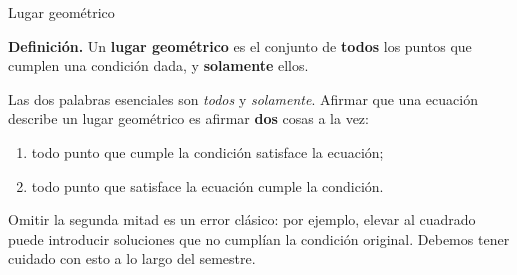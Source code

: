 \documentclass[aspectratio=169,10pt]{beamer}
\newcommand{\destaca}[1]{%
  \par\vspace{3pt}\noindent
  \colorbox{turquesaClaro}{%
    \parbox{\dimexpr\linewidth-2\fboxsep\relax}{\vspace{3pt}#1\vspace{3pt}}}%
  \par\vspace{3pt}}
\begin{document}
\begin{frame}{Lugar geométrico}
  \destaca{\textbf{Definición.} Un \textbf{lugar geométrico} es el
  conjunto de \textbf{todos} los puntos que cumplen una condición dada,
  y \textbf{solamente} ellos.}

  \vspace{0.4cm}
  Las dos palabras esenciales son \textit{todos} y \textit{solamente}.
  Afirmar que una ecuación describe un lugar geométrico es afirmar
  \textbf{dos} cosas a la vez:

  \vspace{0.2cm}
  \begin{enumerate}
    \item todo punto que cumple la condición satisface la ecuación;
    \item todo punto que satisface la ecuación cumple la condición.
  \end{enumerate}

  \vspace{0.3cm}
  {\footnotesize Omitir la segunda mitad es un error clásico: por
  ejemplo, elevar al cuadrado puede introducir soluciones que no
  cumplían la condición original. Debemos tener cuidado con esto a lo largo del semestre.}
\end{frame}
\end{document}
